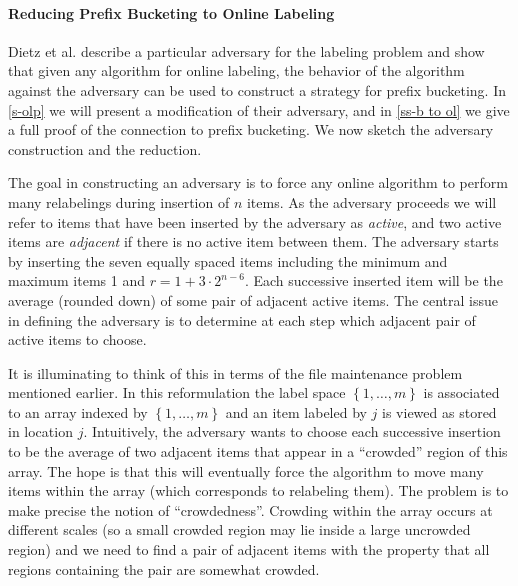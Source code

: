 \documentclass[unicode,review]{siamart1116}
\newcommand{\natInt}[2]{ \left\{ #1, \dotsc, #2 \right\} }
\numberwithin{theorem}{section}
\begin{document}
\paragraph{Reducing Prefix Bucketing to Online Labeling}

Dietz et al. \cite{DSZ04} describe a particular adversary
for the labeling problem and  show that given any algorithm for online labeling, the behavior of the algorithm
against the adversary can be used to construct a strategy for prefix bucketing.   In \cref{s-olp} we will present a
 modification of their adversary, 
and in \cref{ss-b to ol} we give a full proof of the
connection to prefix bucketing.  We now sketch the adversary construction and the reduction.
\iffalse
 If one can show that the cost of the derived bucketing strategy is no more than a constant times  the cost paid by the algorithm for relabelings then a lower bound on bucketing
will give a similar lower bound on the cost of any online labeling algorithm.  Unfortunately, their proof sketch does not show this.
In particular, a single relabeling step may correspond to a bucketing step whose cost is $\Omega(\log n))$, and this
undermines the reduction.
This may happen when inserting $\Theta(\log n)$ items into an empty segment of size $n^\epsilon$ without triggering any relabelings.
We construct a different adversary for which one gets the needed correspondence
between relabeling cost and bucketing steps.
\fi

The goal in constructing an adversary is to force any online algorithm to perform many relabelings during insertion of $n$ items.
As the adversary proceeds we will refer to items that have been inserted by the adversary as  
{\em active}, and two active items are {\em adjacent} if there is no active item between them. 
The adversary starts by inserting the seven equally spaced items including the minimum and maximum items 1 and $r=1+3\cdot 2^{n-6}$. 
Each successive inserted item will be  the average (rounded down) of some pair of adjacent
active items.   The central issue in defining the adversary is to determine at each step which
adjacent  pair of active items to choose. 

It is illuminating to think of this in terms of the file maintenance problem mentioned earlier.
In this reformulation the label space $\natInt{1}{m}$ is associated to an array indexed by $\natInt{1}{m}$
and an item  labeled by $j$ is viewed as stored in location $j$.
Intuitively, the adversary wants to choose each successive insertion to be the
average of two adjacent items that appear in a ``crowded'' region of this array.  The hope is that this will
eventually force the algorithm to move many items within the array (which corresponds to relabeling them).
The problem is to make precise the notion of ``crowdedness''.
Crowding within the array occurs at different scales (so a small crowded region may lie inside a large uncrowded region)
and we need to find a pair of adjacent items with the property that all regions containing the pair are somewhat crowded.
\end{document}
